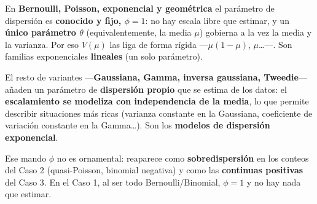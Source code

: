 \documentclass[
  letterpaper,
  DIV=11,
  numbers=noendperiod]{scrartcl}
\begin{document}
\begin{tcolorbox}[enhanced jigsaw, coltitle=black, rightrule=.15mm, arc=.35mm, leftrule=.75mm, colback=white, colbacktitle=quarto-callout-note-color!10!white, left=2mm, breakable, toptitle=1mm, toprule=.15mm, bottomtitle=1mm, titlerule=0mm, title=\textcolor{quarto-callout-note-color}{\faInfo}\hspace{0.5em}{¿Uno o dos parámetros? El papel de \(\phi\)}, bottomrule=.15mm, opacityback=0, opacitybacktitle=0.6, colframe=quarto-callout-note-color-frame]

En \textbf{Bernoulli, Poisson, exponencial y geométrica} el parámetro de
dispersión es \textbf{conocido y fijo, \(\phi=1\)}: no hay escala libre
que estimar, y un \textbf{único parámetro \(\theta\)} (equivalentemente,
la media \(\mu\)) gobierna a la vez la media y la varianza. Por eso
\(V(\mu)\) las liga de forma rígida ---\(\mu(1-\mu)\), \(\mu\)\ldots---.
Son familias exponenciales \textbf{lineales} (un solo parámetro).

El resto de variantes ---\textbf{Gaussiana, Gamma, inversa gaussiana,
Tweedie}--- añaden un parámetro de \textbf{dispersión propio} que se
estima de los datos: el \textbf{escalamiento se modeliza con
independencia de la media}, lo que permite describir situaciones más
ricas (varianza constante en la Gaussiana, coeficiente de variación
constante en la Gamma\ldots). Son los \textbf{modelos de dispersión
exponencial}.

Ese mando \(\phi\) no es ornamental: reaparece como
\textbf{sobredispersión} en los conteos del Caso 2 (quasi-Poisson,
binomial negativa) y como las \textbf{continuas positivas} del Caso 3.
En el Caso 1, al ser todo Bernoulli/Binomial, \(\phi=1\) y no hay nada
que estimar.

\end{tcolorbox}
\end{document}
